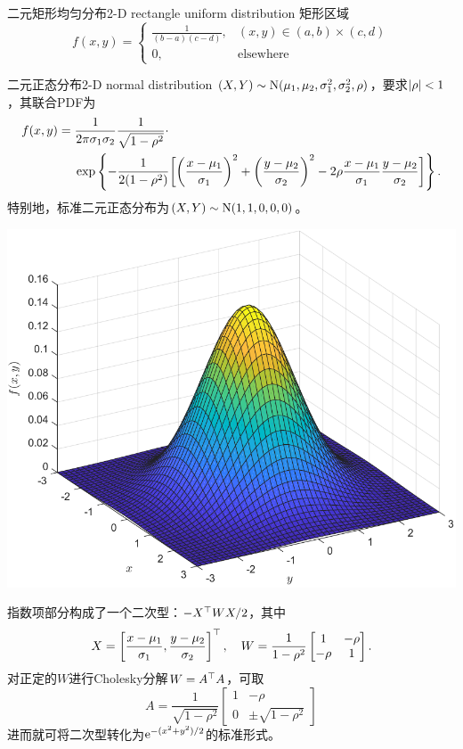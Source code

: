 \begin{example}{二元矩形均匀分布}{2-D rectangle uniform distribution}
	矩形区域
	\[
		f(x,y)=\begin{cases}
			\frac1{(b-a)(c-d)},&(x,y)\in(a,b)\times(c,d)\\
			0,&\text{elsewhere}
		\end{cases}
	\]
\end{example}
\begin{example}{二元正态分布}{2-D normal distribution}
	$(X,Y)\sim\operatorname{N}(\mu_1,\mu_2,\sigma_1^2,\sigma_2^2,\rho)$，要求$\left\lvert\rho\right\rvert<1$，其联合PDF为
	\begin{align}
		\begin{aligned}
			f(x,y)={}&\frac1{2\pi\sigma_1\sigma_2}\frac1{\sqrt{1-\rho^2}}\cdot\\
			&\exp\left\{-\frac1{2(1-\rho^2)}\biggl[\biggl(\frac{x-\mu_1}{\sigma_1}\biggr)^2+\biggl(\frac{y-\mu_2}{\sigma_2}\biggr)^2-2\rho\frac{x-\mu_1}{\sigma_1}\frac{y-\mu_2}{\sigma_2}\biggr]\right\}.
		\end{aligned}
	\end{align}
	特别地，标准二元正态分布为$(X,Y)\sim\operatorname{N}(1,1,0,0,0)$。
	\begin{center}
		\includegraphics[width=.9\textwidth]{figures/pdf_norm2.pdf}
		\label{fig:pdf_norm2}
	\end{center}
	\tcblower
	指数项部分构成了一个二次型：$-X^\top WX/2$，其中
	\[
		X=\left[\frac{x-\mu_1}{\sigma_1},\frac{y-\mu_2}{\sigma_2}\right]^\top,\quad W=\frac1{1-\rho^2}\begin{bmatrix}
			1&-\rho\\-\rho&1
		\end{bmatrix}.
	\]
	对正定的$W$进行Cholesky分解$W=A^\top A$，可取
	\[
		A=\frac1{\sqrt{1-\rho^2}}\begin{bmatrix}
			1&-\rho\\0&\pm\sqrt{1-\rho^2}
		\end{bmatrix}
	\]
	进而就可将二次型转化为$\mathop{}\!\mathrm{e}^{-(x^2+y^2)/2}$的标准形式。
\end{example}

